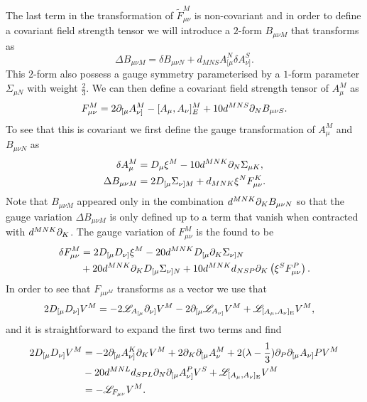 The last term in the transformation of $\tilde{F}^M_{\mu\nu}$ is non-covariant and in order to define a covariant field strength tensor we will introduce a $2$-form $B_{\mu\nu M}$ that transforms as 
\begin{equation}
    \Delta B_{\mu\nu M} = \delta B_{\mu\nu N}+d_{MNS}A^N_{[\mu}\delta A^S_{\nu]}.
\end{equation}
This $2$-form also possess a gauge symmetry parameterised by a $1$-form parameter $\Sigma_{\mu N}$ with weight $\frac{2}{3}$. We can then define a covariant field strength tensor of $A^M_\mu$ as 
\begin{equation}
    F_{\mu\nu}^M = 2\partial_{[\mu}A_{\nu]}^M-[A_\mu,A_\nu]_E^M+10d^{MNS}\partial_NB_{\mu\nu S}.
\end{equation}
To see that this is covariant we first define the gauge transformation of $A_\mu^M$ and $B_{\mu\nu N}$ as 
\begin{equation}
    \begin{aligned}
    \delta A_\mu^M &= D_\mu\xi^M-10d^{MNK}\partial_N\Sigma_{\mu K},\\
    \Delta B_{\mu\nu M} &= 2D_{[\mu}\Sigma_{\nu]M}+d_{MNK}\xi^NF_{\mu\nu}^K.
    \end{aligned}
\end{equation}
Note that $B_{\mu\nu M}$ appeared only in the combination $d^{MNK}\partial_KB_{\mu\nu N}$ so that the gauge variation $\Delta B_{\mu\nu M}$ is only defined up to a term that vanish when contracted with $d^{MNK}\partial_K$. The gauge variation of $F_{\mu\nu}^M$ is the found to be
\begin{equation}\label{eq:GaugeVariationE6}
    \begin{aligned}
        \delta F_{\mu\nu}^M &= 2D_{[\mu}D_{\nu]}\xi^M-20d^{MNK}D_{[\mu}\partial_K\Sigma_{\nu]N}\\
        &+20d^{MNK}\partial_KD_{[\mu}\Sigma_{\nu]N}+10d^{MNK}d_{NSP}\partial_K\left(\xi^SF_{\mu\nu}^P\right).
    \end{aligned}
\end{equation}
In order to see that $F_{\mu\nu^M}$ transforms as a vector we use that 
\begin{equation}
    \begin{aligned}
    2D_{[\mu}D_{\nu]}V^M &=-2\mathscr{L}_{A_{[\mu}}\partial_{\nu]}V^M-2\partial_{[\mu}\mathscr{L}_{A_{\nu]}}V^M+\mathscr{L}_{[A_\mu,A_\nu]_{\text{E}}}V^M,
    \end{aligned}
\end{equation}
and it is straightforward to expand the first two terms and find 
\begin{equation}\label{eq:E6FMUNUCOMM}
    \begin{aligned}
        2D_{[\mu}D_{\nu]}V^M &= -2\partial_{[\mu} A_{\nu]}^K\partial_KV^M+2\partial_K\partial_{[\mu}A_{\nu}^M+2(\lambda-\frac{1}{3})\partial_P\partial_{[\mu}A_{\nu]}PV^M\\
        &-20d^{MNL}d_{SPL}\partial_N\partial_{[\mu}A_{\nu]}^PV^S+\mathscr{L}_{[A_\mu,A_\nu]_{\text{E}}}V^M\\
        &= -\mathscr{L}_{F_{\mu\nu}}V^M.
    \end{aligned}
\end{equation}
